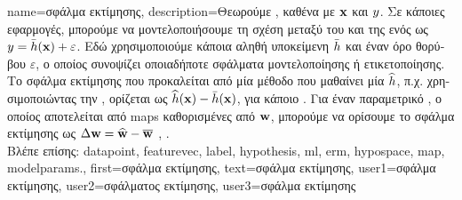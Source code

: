{name={\foreignlanguage{greek}{σφάλμα εκτίμησης}},
	description={\foreignlanguage{greek}{Θεωρούμε} , 
		\foreignlanguage{greek}{καθένα με}  ${\bf x}$ \foreignlanguage{greek}{και}  
		$y$. \foreignlanguage{greek}{Σε κάποιες εφαρμογές, μπορούμε να μοντελοποιήσουμε τη σχέση μεταξύ του}  
		\foreignlanguage{greek}{και της}  \foreignlanguage{greek}{ενός}  \foreignlanguage{greek}{ως} 
		$y = \bar{h}({\bf x}) + \varepsilon$. \foreignlanguage{greek}{Εδώ χρησιμοποιούμε κάποια αληθή υποκείμενη}
		 $\bar{h}$ \foreignlanguage{greek}{και έναν όρο θορύβου $\varepsilon$, 
		ο οποίος συνοψίζει οποιαδήποτε σφάλματα μοντελοποίησης ή ετικετοποίησης. Το σφάλμα εκτίμησης που προκαλείται από μία μέθοδο} 
		 \foreignlanguage{greek}{που μαθαίνει μία}  $\widehat{h}$, 
		\foreignlanguage{greek}{π.χ. χρησιμοποιώντας την} , \foreignlanguage{greek}{ορίζεται ως  
		$\widehat{h}({\bf x}) - \bar{h}({\bf x})$, για κάποιο} . 
		\foreignlanguage{greek}{Για έναν παραμετρικό} , \foreignlanguage{greek}{ο οποίος αποτελείται από} \gls{map}s
		 \foreignlanguage{greek}{καθορισμένες από}  ${\bf w}$, 
		\foreignlanguage{greek}{μπορούμε να ορίσουμε το σφάλμα εκτίμησης ως} $\Delta {\bf w} = \widehat{{\bf w}} - \overline{{\bf w}}$ 
		\cite{hastie01statisticallearning}, \cite{kay}.\\
		\foreignlanguage{greek}{Βλέπε επίσης:} \gls{datapoint}, \gls{featurevec}, \gls{label}, \gls{hypothesis}, \gls{ml}, \gls{erm}, \gls{hypospace}, 
		\gls{map}, \gls{modelparams}.},
	first={\foreignlanguage{greek}{σφάλμα εκτίμησης}},
	text={\foreignlanguage{greek}{σφάλμα εκτίμησης}},
	user1={\foreignlanguage{greek}{σφάλμα εκτίμησης}}, %
    	user2={\foreignlanguage{greek}{σφάλματος εκτίμησης}}, %
	user3={\foreignlanguage{greek}{σφάλμα εκτίμησης}} %
}

